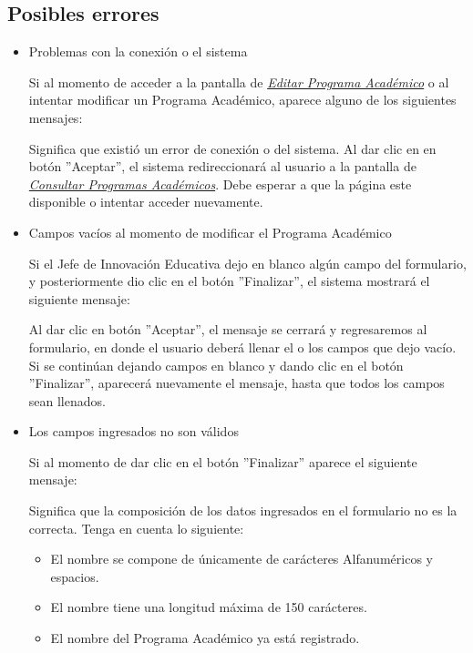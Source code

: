         \subsection{Posibles errores}

            \begin{itemize}
            	\item Problemas con la conexión o el sistema

                	Si al momento de acceder a la pantalla de \hyperlink{editarpa}{\textit{Editar Programa Académico}} o al intentar modificar un Programa Académico, aparece alguno de los siguientes mensajes:


                	Significa que existió un error de conexión o del sistema. Al dar clic en en botón ''Aceptar'', el sistema redireccionará al usuario a la pantalla de \hyperlink{consultarpa}{\textit{Consultar Programas Académicos}}. Debe esperar a que la página este disponible o intentar acceder nuevamente.

            	\item Campos vacíos al momento de modificar el Programa Académico

                	Si el Jefe de Innovación Educativa dejo en blanco algún campo del formulario, y posteriormente dio clic en el botón ''Finalizar'', el sistema mostrará el siguiente mensaje:


            	    Al dar clic en botón ''Aceptar'', el mensaje se cerrará y regresaremos al formulario, en donde el usuario deberá llenar el o los campos que dejo vacío. Si se continúan dejando campos en blanco y dando clic en el botón ''Finalizar'', aparecerá nuevamente el mensaje, hasta que todos los campos sean llenados.

            	\item Los campos ingresados no son válidos

                	Si al momento de dar clic en el botón ''Finalizar'' aparece el siguiente mensaje:

                	Significa que la composición de los datos ingresados en el formulario no es la correcta. Tenga en cuenta lo siguiente:

                	\begin{itemize}
                		\item El nombre se compone de únicamente de carácteres Alfanuméricos y espacios.

                        \item El nombre tiene una longitud máxima de 150 carácteres.

                        \item El nombre del Programa Académico ya está registrado.
                	\end{itemize}

            \end{itemize}
